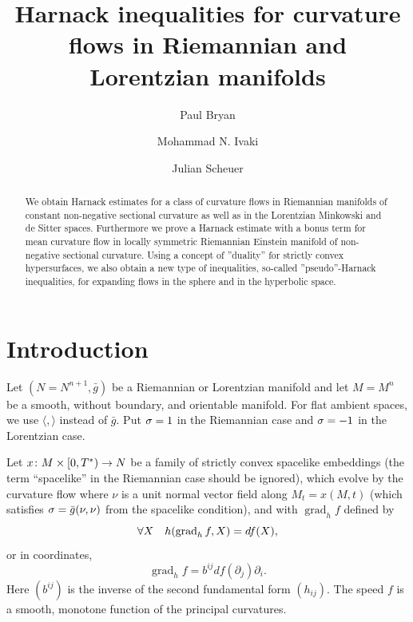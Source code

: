 
\usepackage{mathrsfs}
\usepackage{graphicx}
\graphicspath{ {images/} }
\DeclareMathOperator{\ad}{ad}
\newenvironment{hproof}{%
  \renewcommand{\proofname}{Sketch of proof}\proof}{\endproof}




\title[Harnack inequalities for curvature flows]{Harnack inequalities for curvature flows in Riemannian and Lorentzian manifolds}
\author[P. Bryan]{Paul Bryan}
\address{Mathematics Institute, University of Warwick
Coventry, CV4 7AL, England}
\author[M.N. Ivaki]{Mohammad N. Ivaki}
\address{Institut f\"{u}r Diskrete Mathematik und Geometrie, Technische Universit\"{a}t Wien,
Wiedner Hauptstr. 8--10, 1040 Wien, Austria}
\address{Department of Mathematics and Statistics, Concordia University, Montreal, QC,
H3G 1M8, Canada}
\author[J. Scheuer]{Julian Scheuer}
\address{Albert-Ludwigs-Universit\"{a}t,
Mathematisches Institut, Eckerstr. 1, 79104
Freiburg, Germany}
\dedicatory{}
\subjclass[2010]{}
\begin{abstract}
We obtain Harnack estimates for a class of curvature flows in Riemannian manifolds of constant non-negative sectional curvature as well as in the Lorentzian Minkowski and de Sitter spaces. Furthermore we prove a Harnack estimate with a bonus term for mean curvature flow in locally symmetric Riemannian Einstein manifold of non-negative sectional curvature. Using a concept of ”duality” for strictly convex hypersurfaces, we
also obtain a new type of inequalities, so-called ”pseudo”-Harnack inequalities, for expanding flows in the sphere and in the hyperbolic space.
\end{abstract}
\maketitle
\section{Introduction}
\label{sec:intro}
Let $(N=N^{n+1},\bar{g})$ be a Riemannian or Lorentzian manifold and let $M=M^{n}$ be a smooth, without boundary, and orientable manifold. For flat ambient spaces, we use $\langle,\rangle$ instead of $\bar{g}.$ Put $\sigma = 1$ in the Riemannian case and $\sigma = -1$ in the Lorentzian case.

Let
$x\colon M\times[0,T^{\ast})\rightarrow N$
be a family of strictly convex spacelike embeddings (the term ``spacelike'' in the Riemannian case should be ignored), which evolve by the curvature flow
where $\nu$ is a unit normal vector field along $M_{t}=x(M,t)$ (which satisfies $\sigma=\bar{g}(\nu,\nu)$ from the spacelike condition), and with $\operatorname{grad}_hf$ defined by
\[
\forall X \quad h(\operatorname{grad}_h f, X) = df (X),
\]
or in coordinates,
\[\operatorname{grad}_hf=b^{ij}df(\partial_j)\partial_i.\]
Here $(b^{ij})$ is the inverse of the second fundamental form $(h_{ij})$. The speed $f$ is a smooth, monotone function of the principal curvatures.

